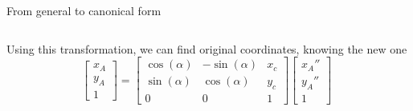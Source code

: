 \documentclass[aspectratio=169]{beamer}
\begin{document}
\begin{frame}[t]{From general to canonical form}
\begin{columns}[onlytextwidth]
Using this transformation, we can find original coordinates, knowing the new one
\begin{equation*} \begin{bmatrix}
x_A\\ y_A \\1
\end{bmatrix} = 
\begin{bmatrix}
\cos(\alpha) & -\sin(\alpha) & x_c \\ \sin(\alpha) & \cos(\alpha) & y_c \\ 0 & 0 & 1
\end{bmatrix} \begin{bmatrix}
{x}_A''\\{y}_A''\\1
\end{bmatrix}
\end{equation*}
\end{columns}
\end{frame}
\end{document}
